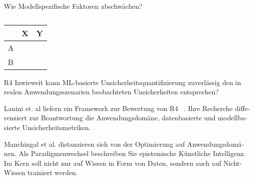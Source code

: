 \begin{otherlanguage}{ngerman}
\newline
Wie Modellspezifische Faktoren abschwächen?

\begin{table}[!htpb]
  \centering
  \begin{tabular}{|l|l|p{\dimexpr\textwidth-8cm-2\tabcolsep}|}  %
    \hline
    & \textbf{X} & \textbf{Y} \\
    \hline
    A & & \\
    \hline
    B & & \\
    \hline
  \end{tabular}
  \caption{}\label{tab:chapter6r32}
\end{table}



R4 Inwieweit kann ML-basierte Unsicherheitsquantifizierung zuverlässig den in realen Anwendungsszenarien beobachteten Unsicherheiten entsprechen?

\newline
Lanini et. al liefern ein Framework zur Bewertung von R4 ~\parencite{Lanini2024}. Ihre Recherche differenziert zur Beantwortung die Anwendungsdomäne, datenbasierte und modellbasierte Unsicherheitsmetriken.  

\newline
Manchingal et al. distanzieren sich von der Optimierung auf Anwendungsdomänen. Als Paradigmenwechsel beschreiben Sie epistemische Künstliche Intelligenz. Im Kern soll nicht nur auf Wissen in Form von Daten, sondern auch auf Nicht-Wissen trainiert werden. \parencite{manchingal2025}








\parencite{Ulmer2023}

~\nocite{Gawlikowski2023}


\end{otherlanguage}
